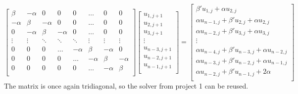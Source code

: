 \[
    \begin{bmatrix}
        \beta & -\alpha & 0 & 0 & 0 & \dots & 0 & 0  \\
        -\alpha & \beta & -\alpha & 0 & 0 & \dots & 0 & 0  \\
        0 & -\alpha & \beta & -\alpha & 0 & \dots & 0 & 0 \\
        \vdots & \vdots &  \ddots & \ddots & \ddots & \vdots & \vdots & \vdots\\
        0 & 0 & 0 & \dots & -\alpha & \beta & - \alpha & 0\\
        0 & 0 & 0 & 0 & \dots & -\alpha & \beta & - \alpha\\
        0 & 0 & 0 & 0 & 0 & \dots & -\alpha & \beta\\
    \end{bmatrix}
    \begin{bmatrix}
        u_{1,j+1}\\
        u_{2,j+1}\\
        u_{3,j+1}\\
        \vdots\\
        u_{n-3,j+1}\\
        u_{n-2,j+1}\\
        u_{n-1,j+1}\\
    \end{bmatrix}
    =
    \begin{bmatrix}
        \beta' u_{1,j} + \alpha u_{2,j}\\
        \alpha u_{n-1,j} + \beta' u_{2,j} + \alpha u_{2,j}\\
        \alpha u_{n-2,j} + \beta' u_{3,j} + \alpha u_{3,j}\\
        \vdots\\
        \alpha u_{n-4,j} + \beta' u_{n-3,j} + \alpha u_{n-2,j}\\
        \alpha u_{n-3,j} + \beta' u_{n-2,j} + \alpha u_{n-1,j}\\
        \alpha u_{n-2,j} + \beta' u_{n-1,j} + 2\alpha\\
    \end{bmatrix}
\]
The matrix is once again tridiagonal, so the solver from project 1 can be reused.


